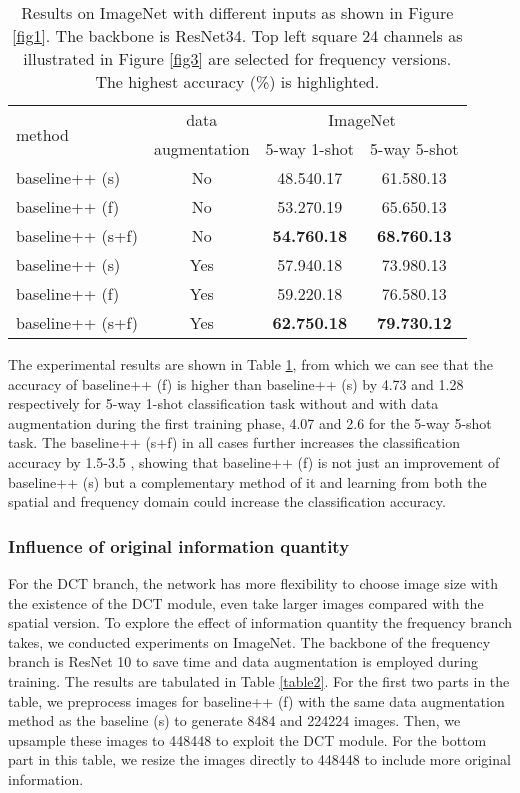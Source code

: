 \documentclass[10pt, conference, compsocconf]{IEEEtran}
\begin{document}
\begin{table}[pb]
\centering
\caption{Results on ImageNet with different inputs as shown in Figure \ref{fig1}. The backbone is ResNet34. Top left square 24 channels {}{as illustrated in Figure \ref{fig3}} are selected for frequency versions. The highest accuracy (\%) is highlighted.}
\begin{tabular}{l|c|cc}
\toprule
\multirow{2}{*}{method} & {}{data} & \multicolumn{2}{c}{ImageNet} \\
&{}{augmentation} &5-way 1-shot& 5-way 5-shot\\ \hline
baseline++ (s) & {}{No} & 48.540.17 & 61.580.13 \\
baseline++ (f) & {}{No} & 53.270.19 & 65.650.13 \\
baseline++ (s+f) & {}{No} & {}{\bf{54.760.18}} & {}{\bf{68.760.13}} \\\hline
baseline++ (s) & {}{Yes} & 57.940.18 & 73.980.13 \\
baseline++ (f) & {}{Yes} & 59.220.18 & 76.580.13 \\
baseline++ (s+f) & {}{Yes} & {}{\bf{62.750.18}} & {}{\bf{79.730.12}} \\
\bottomrule
\end{tabular}
\label{table1}
\end{table}

The experimental results are shown in Table \ref{table1}, from which we can see that the accuracy of baseline++ (f) is higher than baseline++ (s) by 4.73 and 1.28 respectively for 5-way 1-shot classification task without and with data augmentation during the first training phase, 4.07 and 2.6 for the 5-way 5-shot task. The baseline++ (s+f) in {}{all} cases further increases the classification accuracy by 1.5-3.5 , showing that baseline++ (f) is not just an improvement of  baseline++ (s) but a complementary method of it and learning from both the spatial and frequency domain could increase the classification accuracy.

\subsubsection{Influence of original information quantity}

For the DCT branch, the network has more flexibility to choose image size with the existence of the DCT module, even take larger images compared with the spatial version.  To explore the effect of information quantity the frequency branch takes, we conducted experiments on ImageNet. The backbone of the frequency branch is ResNet 10 to save time and data augmentation is employed during training. The results are tabulated in Table \ref{table2}. For the first two parts in the table, we preprocess images for baseline++ (f) {}{with the same data augmentation method} as the baseline (s) to generate 8484 and 224224 images. Then, we upsample these images to 448448 to exploit the DCT module. For the bottom part in this table, we resize the images directly to 448448 to include more original information. 
\end{document}
